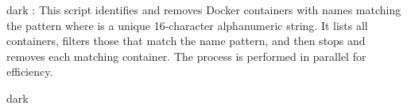 \label{Removal Script}
\begin{baseBoxThree}{}{dark}
    \bigskip
    : This script identifies and removes Docker containers with names matching the pattern  where  is a unique 16-character alphanumeric string.
    It lists all containers, filters those that match the name pattern, and then stops and removes each matching container.
    The process is performed in parallel for efficiency.
    \bigskip
    \begin{baseBoxThree}{}{dark}
    \end{baseBoxThree}
    \smallskip
\end{baseBoxThree}

